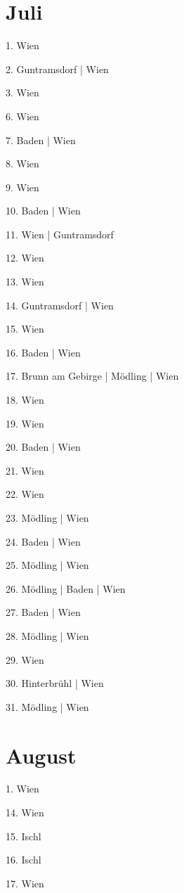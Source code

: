 \documentclass[twoside=false,titlepage=false,open=any, parskip=never, fontsize=10pt, headings=small, chapterprefix=false, appendixprefix=false, DIV=15]{scrbook}
\begin{document}
\begin{multicols}{3}
            \section*{Juli}
            1. Wien\par
            2. Guntramsdorf | Wien\par
            3. Wien\par
            6. Wien\par
            7. Baden | Wien\par
            8. Wien\par
            9. Wien\par
            10. Baden | Wien\par
            11. Wien | Guntramsdorf\par
            12. Wien\par
            13. Wien\par
            14. Guntramsdorf | Wien\par
            15. Wien\par
            16. Baden | Wien\par
            17. Brunn am Gebirge | Mödling | Wien\par
            18. Wien\par
            19. Wien\par
            20. Baden | Wien\par
            21. Wien\par
            22. Wien\par
            23. Mödling | Wien\par
            24. Baden | Wien\par
            25. Mödling | Wien\par
            26. Mödling | Baden | Wien\par
            27. Baden | Wien\par
            28. Mödling | Wien\par
            29. Wien\par
            30. Hinterbrühl | Wien\par
            31. Mödling | Wien\par
            \section*{August}
            1. Wien\par
            14. Wien\par
            15. Ischl\par
            16. Ischl\par
            17. Wien\par

\end{multicols}
\end{document}
